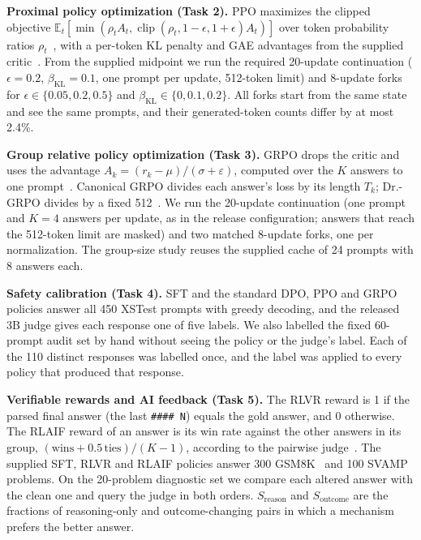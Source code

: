 \documentclass{article}
\begin{document}
\textbf{Proximal policy optimization (Task 2).} PPO maximizes the clipped objective $\mathbb{E}_t[\min(\rho_tA_t,\operatorname{clip}(\rho_t,1{-}\epsilon,1{+}\epsilon)A_t)]$ over token probability ratios $\rho_t$~\cite{schulman2017ppo}, with a per-token KL penalty and GAE advantages from the supplied critic~\cite{schulman2016gae}. From the supplied midpoint we run the required 20-update continuation ($\epsilon=0.2$, $\beta_{\text{KL}}=0.1$, one prompt per update, 512-token limit) and 8-update forks for $\epsilon\in\{0.05,0.2,0.5\}$ and $\beta_{\text{KL}}\in\{0,0.1,0.2\}$. All forks start from the same state and see the same prompts, and their generated-token counts differ by at most 2.4\%.

\textbf{Group relative policy optimization (Task 3).} GRPO drops the critic and uses the advantage $A_k=(r_k-\mu)/(\sigma+\varepsilon)$, computed over the $K$ answers to one prompt~\cite{shao2024deepseekmath}. Canonical GRPO divides each answer's loss by its length $T_k$; Dr.-GRPO divides by a fixed 512~\cite{liu2025understanding}. We run the 20-update continuation (one prompt and $K=4$ answers per update, as in the release configuration; answers that reach the 512-token limit are masked) and two matched 8-update forks, one per normalization. The group-size study reuses the supplied cache of 24 prompts with 8 answers each.

\textbf{Safety calibration (Task 4).} SFT and the standard DPO, PPO and GRPO policies answer all 450 XSTest prompts with greedy decoding, and the released 3B judge gives each response one of five labels. We also labelled the fixed 60-prompt audit set by hand without seeing the policy or the judge's label. Each of the 110 distinct responses was labelled once, and the label was applied to every policy that produced that response.

\textbf{Verifiable rewards and AI feedback (Task 5).} The RLVR reward is 1 if the parsed final answer (the last \texttt{\#\#\#\# N}) equals the gold answer, and 0 otherwise. The RLAIF reward of an answer is its win rate against the other answers in its group, $(\text{wins}+0.5\,\text{ties})/(K-1)$, according to the pairwise judge~\cite{lee2024rlaif,bai2022constitutional}. The supplied SFT, RLVR and RLAIF policies answer 300 GSM8K~\cite{cobbe2021gsm8k} and 100 SVAMP~\cite{patel2021svamp} problems. On the 20-problem diagnostic set we compare each altered answer with the clean one and query the judge in both orders. $S_{\text{reason}}$ and $S_{\text{outcome}}$ are the fractions of reasoning-only and outcome-changing pairs in which a mechanism prefers the better answer.
\end{document}
